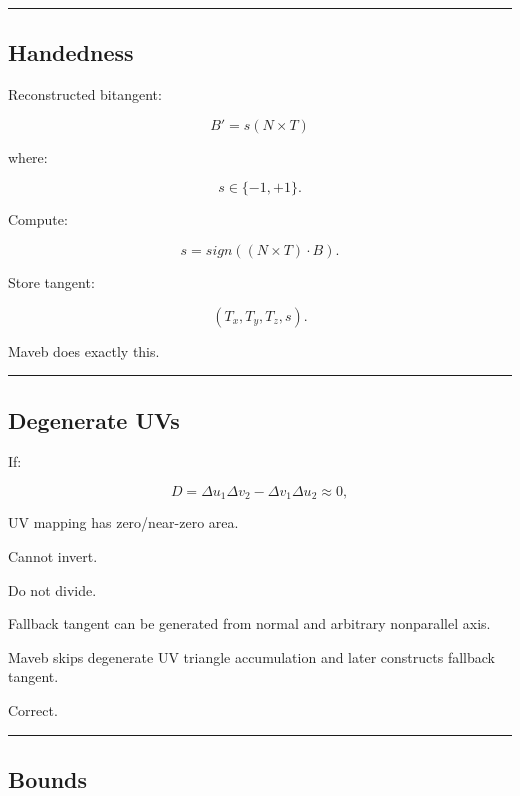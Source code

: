 \begin{center}\rule{0.5\linewidth}{0.5pt}\end{center}

\subsection{Handedness}\label{04-visual-computing-ii-ch041-handedness}

\hypertarget{04-visual-computing-ii-ch041-handedness}{}

Reconstructed bitangent:

\[
B'
=
s(N\times T)
\]

where:

\[
s\in\{-1,+1\}.
\]

Compute:

\[
\boxed{
s=
sign(
(N\times T)\cdot B
).
}
\]

Store tangent:

\[
(T_x,T_y,T_z,s).
\]

Maveb does exactly this.

\begin{center}\rule{0.5\linewidth}{0.5pt}\end{center}

\subsection{Degenerate UVs}\label{04-visual-computing-ii-ch041-degenerate-uvs}

\hypertarget{04-visual-computing-ii-ch041-degenerate-uvs}{}

If:

\[
D
=
\Delta u_1\Delta v_2-
\Delta v_1\Delta u_2
\approx0,
\]

UV mapping has zero/near-zero area.

Cannot invert.

Do not divide.

Fallback tangent can be generated from normal and arbitrary nonparallel axis.

Maveb skips degenerate UV triangle accumulation and later constructs fallback tangent.

Correct.

\begin{center}\rule{0.5\linewidth}{0.5pt}\end{center}

\subsection{Bounds}\label{04-visual-computing-ii-ch041-bounds}

